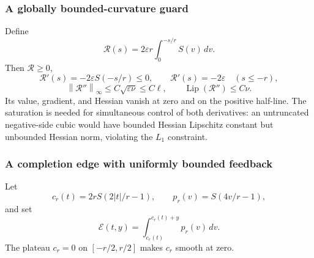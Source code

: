 \documentclass[11pt]{article}
\theoremstyle{remark}
\theoremstyle{remark}
\newcommand{\eps}{\varepsilon}
\newcommand{\norm}[1]{\left\lVert#1\right\rVert}
\newcommand{\Lip}{\operatorname{Lip}}
\begin{document}
\subsubsection{A globally bounded-curvature guard}
Define
\begin{equation}\label{eq:saturated-guard}
 \mathcal R(s)=2\eps r\int_0^{-s/r} S(v)\,dv.
\end{equation}
Then $\mathcal R\ge0$,
\[
 \mathcal R'(s)=-2\eps S(-s/r)\le0,
 \qquad \mathcal R'(s)=-2\eps\quad(s\le-r),
\]
\[
 \norm{\mathcal R''}_\infty\le C\sqrt{\eps\nu}\le C\ell,
 \qquad \Lip(\mathcal R'')\le C\nu.
\]
Its value, gradient, and Hessian vanish at zero and on the positive half-line.
The saturation is needed for simultaneous control of both derivatives: an untruncated negative-side cubic would have bounded Hessian Lipschitz constant but unbounded Hessian norm, violating the $L_1$ constraint.

\subsubsection{A completion edge with uniformly bounded feedback}
Let
\[
 c_r(t)=2rS(2|t|/r-1),\qquad p_r(v)=S(4v/r-1),
\]
and set
\begin{equation}\label{eq:new-edge}
 \mathcal E(t,y)=\int_{c_r(t)}^{c_r(t)+y}p_r(v)\,dv.
\end{equation}
The plateau $c_r=0$ on $[-r/2,r/2]$ makes $c_r$ smooth at zero.
\end{document}
